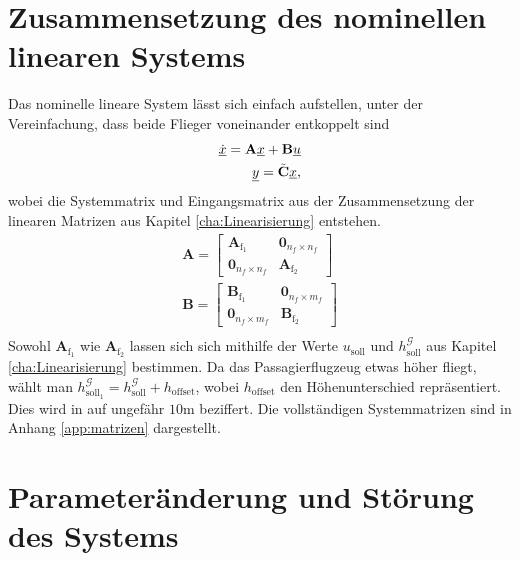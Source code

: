 \section{Zusammensetzung des nominellen linearen Systems}
Das nominelle lineare System lässt sich einfach aufstellen, unter der Vereinfachung, dass beide Flieger voneinander entkoppelt sind
\begin{align}
\underline{\dot{x}} = \textbf{A}\underline{x} + \textbf{B}\underline{u}\\
\underline{y} = \Tilde{\textbf{C}}\underline{x},
\end{align}
wobei die Systemmatrix und Eingangsmatrix aus der Zusammensetzung der linearen Matrizen aus Kapitel \ref{cha:Linearisierung} entstehen.
\begin{align}
\textbf{A} = \begin{bmatrix} 
\textbf{A}_\mathrm{f_1}& \textbf{0}_{n_f\times n_f}\\
\textbf{0}_{n_f\times n_f} & \textbf{A}_\mathrm{f_2}
\end{bmatrix}\\
\textbf{B} = \begin{bmatrix} 
\textbf{B}_\mathrm{f_1}& \textbf{0}_{n_f\times m_f}\\
\textbf{0}_{n_f\times m_f} & \textbf{B}_\mathrm{f_2}
\end{bmatrix}\\
\end{align}
Sowohl $\textbf{A}_\mathrm{f_1}$ wie $\textbf{A}_\mathrm{f_2}$ lassen sich sich mithilfe der Werte $u_\mathrm{soll}$ und $h^\mathcal{G}_\mathrm{soll}$ aus Kapitel \ref{cha:Linearisierung} bestimmen. Da das Passagierflugzeug etwas höher fliegt, wählt man $h^\mathcal{G}_\mathrm{soll_1} = h^\mathcal{G}_\mathrm{soll} + h_\mathrm{offset}$, wobei $h_\mathrm{offset}$ den Höhenunterschied repräsentiert. Dies wird in  \cite{LengthBoom} auf ungefähr $10 \mathrm{m}$ beziffert. Die vollständigen Systemmatrizen sind in Anhang \ref{app:matrizen} dargestellt.
\section{Parameteränderung und Störung des Systems}
